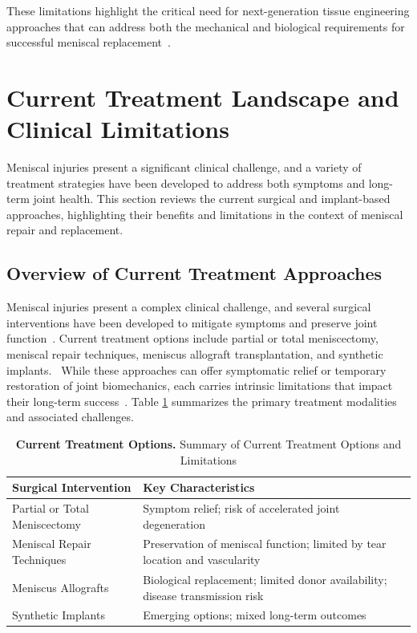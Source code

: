 These limitations highlight the critical need for next-generation tissue engineering approaches that can address both the mechanical and biological requirements for successful meniscal replacement~\cite{a.murphy20243dprintedvariable, bahcecioglu20193dprinted, li2024advancedhydrogel}.

\section{Current Treatment Landscape and \protect\\ Clinical Limitations}

Meniscal injuries present a significant clinical challenge, and a variety of treatment strategies have been developed to address both symptoms and long-term joint health. This section reviews the current surgical and implant-based approaches, highlighting their benefits and limitations in the context of meniscal repair and replacement.

\subsection{Overview of Current Treatment Approaches}

Meniscal injuries present a complex clinical challenge, and several surgical interventions have been developed to mitigate symptoms and preserve joint function~\cite{kwon2019surgicaltissue, li2024totalmeniscus, merriam2015successfultotal, sun2017overviewscaffold}.
Current treatment options include partial or total meniscectomy, meniscal repair techniques, meniscus allograft transplantation, and synthetic implants.~\cite{beeler2020meniscussizing}
While these approaches can offer symptomatic relief or temporary restoration of joint biomechanics, each carries intrinsic limitations that impact their long-term success~\cite{ghodbane2019partialmeniscus, sun2017overviewscaffold}.
Table \ref{tab:treatment_summary} summarizes the primary treatment modalities and associated challenges.

\begin{table}[H]
    \centering
    \setlength{\tabcolsep}{8pt}
    \begin{tabular}{|l|p{6.5cm}|}
    \hline
    \rowcolor{gray!20}
    \textbf{Surgical Intervention} & \textbf{Key Characteristics} \\ \hline
    Partial or Total Meniscectomy & Symptom relief; risk of accelerated joint \mbox{degeneration} \\ \hline
    Meniscal Repair Techniques & Preservation of meniscal function; limited by tear location and vascularity \\ \hline
    Meniscus Allografts & Biological replacement; limited donor \mbox{availability}; disease transmission risk \\ \hline
    Synthetic Implants & Emerging options; mixed long-term \mbox{outcomes} \\ \hline
    \end{tabular}
    \caption[Current Treatment Options]{\textbf{Current Treatment Options.} Summary of Current Treatment Options and Limitations}
    \label{tab:treatment_summary}
\end{table}

